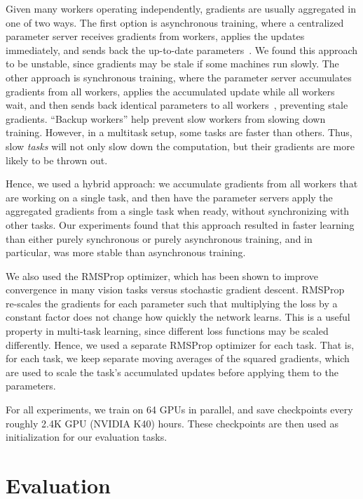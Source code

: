 \documentclass[10pt,twocolumn,letterpaper]{article}
\begin{document}
Given many workers operating independently, gradients are usually aggregated in one of two ways.  
The first option is asynchronous training, where a centralized parameter server receives gradients from workers, applies the updates immediately, and sends back the up-to-date parameters~\cite{recht2011hogwild,dean2012large}.
We found this approach to be unstable, since gradients may be stale if some machines run slowly.
The other approach is synchronous training, where the parameter server accumulates gradients from all workers, applies the accumulated update while all workers wait, and then sends back identical parameters to all workers~\cite{chen2016revisiting}, preventing stale gradients.  
``Backup workers'' help prevent slow workers from slowing down training.
However, in a multitask setup, some tasks are faster than others.
Thus, slow \textit{tasks} will not only slow down the computation, but their gradients are more likely to be thrown out.  

Hence, we used a hybrid approach: we accumulate gradients from all workers that are working on a single task, and then have the parameter servers apply the aggregated gradients from a single task when ready, without synchronizing with other tasks.  
Our experiments found that this approach resulted in faster learning than either purely synchronous or purely asynchronous training, and in particular, was more stable than asynchronous training.

We also used the RMSProp optimizer, which has been shown to improve convergence in many vision tasks versus stochastic gradient descent.  
RMSProp re-scales the gradients for each parameter such that multiplying the loss by a constant factor does not change how quickly the network learns.
This is a useful property in multi-task learning, since different loss functions may be scaled differently.
Hence, we used a separate RMSProp optimizer for each task.
That is, for each task, we keep separate moving averages of the squared gradients, which are used to scale the task's accumulated updates before applying them to the parameters.

For all experiments, we train on 64 GPUs in parallel, and save
checkpoints every roughly 2.4K GPU (NVIDIA K40) hours.  These checkpoints are then
used as initialization for our evaluation tasks.




\section{Evaluation}
\end{document}
